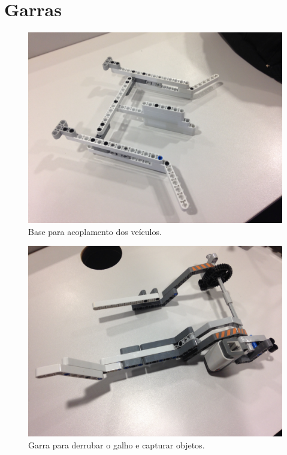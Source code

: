 \documentclass{article}
\begin{document}
\section{Garras}
	\begin{figure}[h!]
		\includegraphics[width=\linewidth]{images/Garra_1.JPG}
		\caption{Base para acoplamento dos veículos.}
		\label{fig:claw_1}
	\end{figure}

	\begin{figure}[h!]
		\includegraphics[width=\linewidth]{images/Garra_2.JPG}
		\caption{Garra para derrubar o galho e capturar objetos.}
		\label{fig:claw_2}
	\end{figure}
\end{document}
